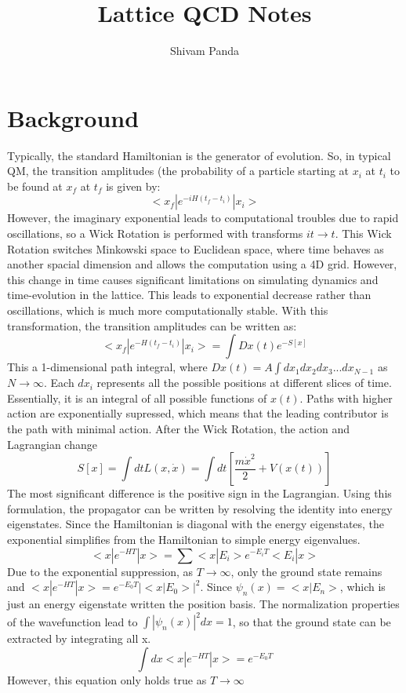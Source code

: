 \documentclass{article}
\title{Lattice QCD Notes}
\author{Shivam Panda}
\date{}
\begin{document}
\maketitle

\section{Background}
Typically, the standard Hamiltonian is the generator of evolution. So, in typical QM, the transition amplitudes (the probability of a particle starting at $x_i$ at $t_i$ to be found at $x_f$ at $t_f$ is given by: 
\begin{equation}
    <x_f|e^{-iH(t_f-t_i)}|x_i>
\end{equation}
However, the imaginary exponential leads to computational troubles due to rapid oscillations, so a Wick Rotation is performed with transforms $it \xrightarrow{} t$. This Wick Rotation switches Minkowski space to Euclidean space, where time behaves as another spacial dimension and allows the computation using a 4D grid. However, this change in time causes significant limitations on simulating dynamics and time-evolution in the lattice. This leads to exponential decrease rather than oscillations, which is much more computationally stable. With this transformation, the transition amplitudes can be written as: 
\begin{equation}
    <x_f|e^{-H(t_f-t_i)}|x_i> =\int Dx(t)e^{-S[x]}
\end{equation}
This a 1-dimensional path integral, where $Dx(t)=A\int dx_1dx_2dx_3...dx_{N-1}$ as $N \xrightarrow{} \infty$. Each $dx_i$ represents all the possible positions at different slices of time. Essentially, it is an integral of all possible functions of $x(t)$. Paths with higher action are exponentially supressed, which means that the leading contributor is the path with minimal action.
After the Wick Rotation, the action and Lagrangian change
\begin{equation}
    S[x] = \int dtL(x,\dot{x})=\int dt[\frac{m\dot{x}^2}{2}+V(x(t))]
\end{equation}
The most significant difference is the positive sign in the Lagrangian. Using this formulation, the propagator can be written by resolving the identity into energy eigenstates. Since the Hamiltonian is diagonal with the energy eigenstates, the exponential simplifies from the Hamiltonian to simple energy eigenvalues.
\begin{equation}
    <x|e^{-HT}|x>=\sum <x|E_i>e^{-E_iT}<E_i|x>
\end{equation}
Due to the exponential suppression, as $T \xrightarrow{} \infty$, only the ground state remains and $<x|e^{-HT}|x>=e^{-E_0T}|<x|E_0>|^2$. Since $\psi_n(x)=<x|E_n>$, which is just an energy eigenstate written the position basis. The normalization properties of the wavefunction lead to $\int |\psi_n(x)|^2dx=1$, so that the ground state can be extracted by integrating all x.
\begin{equation}
    \int dx <x|e^{-HT}|x> =e^{-E_0T}
\end{equation}
However, this equation only holds true as $T \xrightarrow{} \infty$
\end{document}
